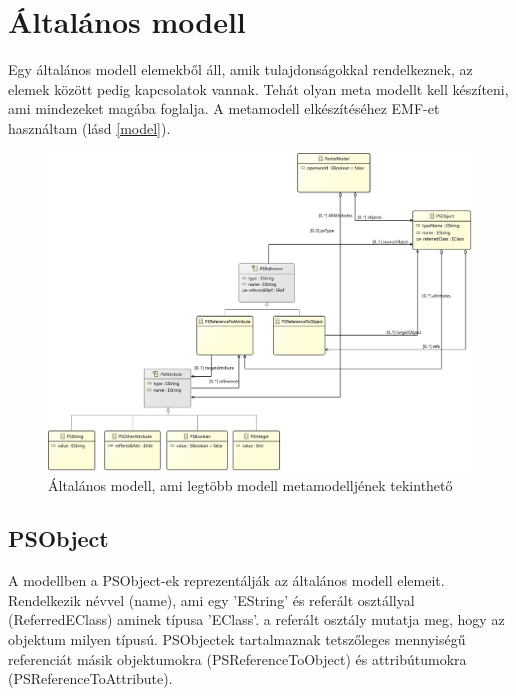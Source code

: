 \nocite{Acceleo}
\nocite{OCL}


\section{Általános modell}

Egy általános modell elemekből áll, amik tulajdonságokkal rendelkeznek, az elemek között pedig kapcsolatok vannak. Tehát olyan meta modellt kell készíteni, ami mindezeket magába foglalja. A metamodell elkészítéséhez EMF-et használtam (lásd \autoref{model}).

\begin{figure}[!ht]
	\centering
	\includegraphics[width=150mm]{figures/partialmodel01.pdf}
	\caption{Általános modell, ami legtöbb modell metamodelljének tekinthető} 
	\label{model}
\end{figure}

\subsection{PSObject}
A modellben a PSObject-ek reprezentálják az általános modell elemeit. Rendelkezik névvel (name), ami egy 'EString' és referált osztállyal (ReferredEClass) aminek típusa 'EClass'. a referált osztály mutatja meg, hogy az objektum milyen típusú. %
PSObjectek tartalmaznak tetszőleges mennyiségű referenciát másik objektumokra (PSReferenceToObject) és attribútumokra (PSReferenceToAttribute).

